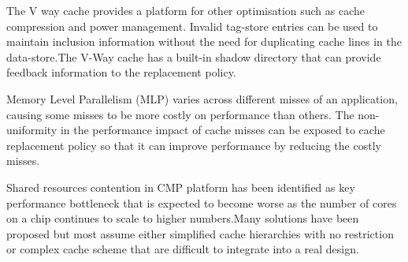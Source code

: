 \documentclass{report}
\begin{document}
The V way cache provides a platform for other optimisation such as cache compression and power management. Invalid tag-store entries can be used to maintain inclusion information without the need for duplicating cache lines in the data-store.The V-Way cache has a built-in shadow directory that can provide feedback information to the replacement policy. \vspace{.8cm}

Memory Level Parallelism (MLP) varies across different misses of an application, causing some misses to be more costly on performance than others. The non-uniformity in the performance impact of cache misses can be exposed to cache replacement policy so that it can improve performance by reducing the costly misses. \vspace{.8cm}

Shared resources contention in CMP platform has been identified as key performance bottleneck that is expected to become worse as the number of cores on a chip continues to scale to higher numbers.Many solutions have been proposed but most assume either simplified cache hierarchies with no restriction or complex cache scheme that are difficult to integrate into a real design.


\newpage


\end{document}
